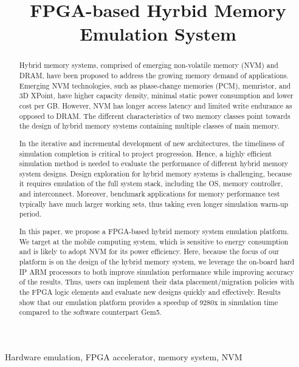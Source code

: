 \documentclass[conference]{IEEEtran}
\begin{document}
\title{FPGA-based Hyrbid Memory Emulation System
}
\author{
}
\maketitle
\thispagestyle{plain}
\pagestyle{plain}
\begin{abstract}
  Hybrid memory systems, comprised of emerging non-volatile memory
  (NVM) and DRAM, have been proposed to address the growing memory
  demand of applications. Emerging NVM technologies, such as
  phase-change memories (PCM), memristor, and 3D XPoint, have higher
  capacity density, minimal static power consumption and lower cost
  per GB. However, NVM has longer access latency and limited write
  endurance as opposed to DRAM. The different characteristics of two
  memory classes point towards the design of hybrid memory systems
  containing multiple classes of main memory.
  
  In the iterative and incremental development of new architectures,
  the timeliness of simulation completion is critical to project
  progression.  Hence, a highly efficient simulation method is needed
  to evaluate the performance of different hybrid memory system
  designs.  Design exploration for hybrid memory systems is challenging, because it requires emulation of the
  full system stack, including the OS, memory controller, and
  interconnect. Moreover, benchmark applications for memory performance test typically have much larger working sets, thus taking even longer simulation warm-up period.
  
  In this paper, we propose a FPGA-based hybrid memory system
  emulation platform.  We target at the mobile computing system, which
  is sensitive to energy consumption and is likely to adopt NVM for
  its power efficiency.  Here, because the focus of our platform is on
  the design of the hybrid memory system, we leverage the on-board
  hard IP ARM processors to both improve simulation performance while
  improving accuracy of the results.  Thus, users can implement their
  data placement/migration policies with the FPGA logic elements and
  evaluate new designs quickly and effectively.  Results show that our
  emulation platform provides a speedup of 9280x in simulation time
  compared to the software counterpart Gem5.
\end{abstract}
\begin{IEEEkeywords}
Hardware emulation, FPGA accelerator, memory system, NVM
\end{IEEEkeywords}
\end{document}
